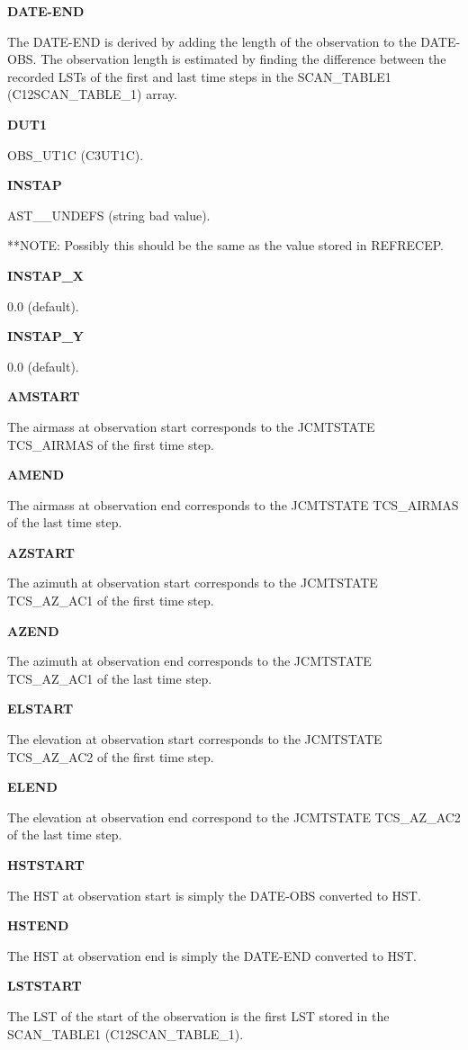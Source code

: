 \documentclass[twoside,11pt,nolof]{starlink}
\providecommand{\obsUTC}{OBS\_UT1C (C3UT1C)}
\providecommand{\scanTableA}{SCAN\_TABLE1 (C12SCAN\_TABLE\_1)}
\begin{document}
\textbf{DATE-END}

The DATE-END is derived by adding the length of the observation to the DATE-OBS.  The observation length is estimated by finding the difference between the recorded LSTs of the first and last time steps in the \scanTableA{} array.

\textbf{DUT1}

\obsUTC.

\textbf{INSTAP}

AST\_\_UNDEFS (string bad value).

**NOTE: Possibly this should be the same as the value stored in REFRECEP.

\textbf{INSTAP\_X}

0.0 (default).

\textbf{INSTAP\_Y}

0.0 (default).

\textbf{AMSTART}

The airmass at observation start corresponds to the JCMTSTATE TCS\_AIRMAS of the first time step.

\textbf{AMEND}

The airmass at observation end corresponds to the JCMTSTATE TCS\_AIRMAS of the last time step.

\textbf{AZSTART}

The azimuth at observation start corresponds to the JCMTSTATE TCS\_AZ\_AC1 of the first time step.

\textbf{AZEND}

The azimuth at observation end corresponds to the JCMTSTATE TCS\_AZ\_AC1 of the last time step.

\textbf{ELSTART}

The elevation at observation start corresponds to the JCMTSTATE TCS\_AZ\_AC2 of the first time step.

\textbf{ELEND}

The elevation at observation end correspond to the JCMTSTATE TCS\_AZ\_AC2 of the last time step.

\textbf{HSTSTART}

The HST at observation start is simply the DATE-OBS converted to HST.

\textbf{HSTEND}

The HST at observation end is simply the DATE-END converted to HST.

\textbf{LSTSTART}

The LST of the start of the observation is the first LST stored in the \scanTableA.
\end{document}
